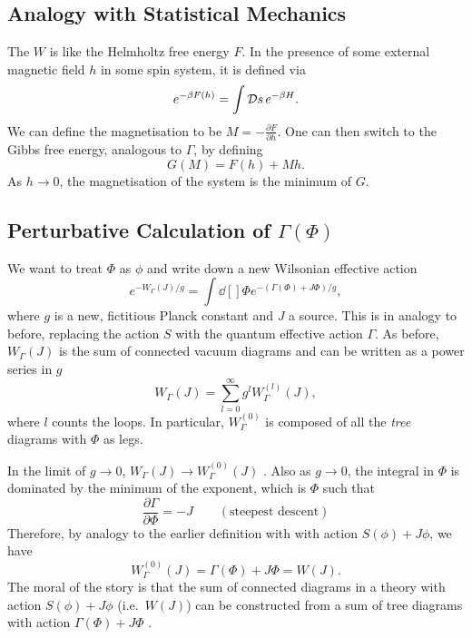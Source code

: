 \subsection{Analogy with Statistical Mechanics}%
\label{sub:analogy_with_statistical_mechanics}

The $W$  is like the Helmholtz free energy $F$. In the presence of some external magnetic field $h$  in some spin system, it is defined via
\begin{equation}
  e^{-\beta F(h)} = \int \mathop{\mathcal{D} s} e^{-\beta H}.
\end{equation}
We can define the magnetisation to be $M = - \frac{\partial F}{\partial h}$.
One can then switch to the Gibbs free energy, analogous to $\Gamma$, by defining
\begin{equation}
  G(M) = F(h) + M h.
\end{equation}
As $h \to 0$, the magnetisation of the system  is the minimum of $G$. 

\subsection{Perturbative Calculation of \texorpdfstring{$\Gamma(\Phi)$}{the Quantum Effective Action}}%
\label{sub:perturbative_calculation_of_gamma_phi_}

We want to treat $\Phi$ as $\phi$ and write down a new Wilsonian effective action
\begin{equation}
  e^{-W_\Gamma (J) / g} = \int \dd[]{\Phi} e^{-(\Gamma(\Phi) + J\Phi) / g},
\end{equation}
where $g$ is a new, fictitious Planck constant and $J$ a source.
This is in analogy to before, replacing the action $S$  with the quantum effective action $\Gamma$.
 As before, $W_\Gamma(J)$  is the sum of connected vacuum diagrams and can be written as a power series in $g$
 \begin{equation}
  W_\Gamma(J) = \sum_{l = 0}^{\infty} g^{l} W_\Gamma^{(l)} (J),
\end{equation}
where $l$ counts the loops.  In particular, $W_\Gamma^{(0)}$  is composed of all the \emph{tree} diagrams with $\Phi$ as legs.

In the limit of $g \to 0$,  $W_\Gamma(J) \to W^{(0)}_\Gamma(J)$ . 
Also as $g \to 0$, the integral in  $\Phi$  is dominated by the minimum of the exponent, which is $\Phi$  such that
\begin{equation}
  \frac{\partial \Gamma}{\partial \Phi} = -J \qquad (\text{steepest descent})
\end{equation}
Therefore, by analogy to the earlier definition with with action $S(\phi) + J \phi$, we have
\begin{equation}
  W_\Gamma^{(0)}(J)= \Gamma(\Phi) + J \Phi = W(J).
\end{equation}
The moral of the story is that the sum of connected diagrams in a theory with action $S(\phi) + J \phi$  (i.e.~$W(J)$) can be constructed from a sum of tree diagrams with action $\Gamma(\Phi) + J \Phi$ .

